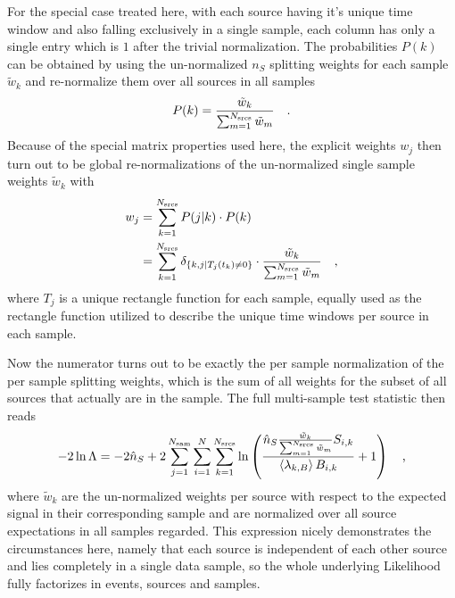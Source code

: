 For the special case treated here, with each source having it's unique time window and also falling exclusively in a single sample, each column has only a single entry which is $1$ after the trivial normalization. 
The probabilities $P(k)$ can be obtained by using the un-normalized $n_S$ splitting weights for each sample $\tilde{w}_k$ and re-normalize them over all sources in all samples
\begin{equation}
  P(k) = \frac{\tilde{w}_k}{\sum_{m=1}^{N_\text{srcs}} \tilde{w}_m}
  \quad\text{.}
\end{equation}
Because of the special matrix properties used here, the explicit weights $w_j$ then turn out to be global re-normalizations of the un-normalized single sample weights $\tilde{w}_k$ with
\begin{align}
  w_j
    &= \sum_{k=1}^{N_\text{srcs}} P(j|k)\cdot P(k) \\
    &= \sum_{k=1}^{N_\text{srcs}}
      \delta_{\{k,j|T_j(t_k)\neq 0\}} \cdot
      \frac{\tilde{w}_k}{\sum_{m=1}^{N_\text{srcs}} \tilde{w}_m}
  \quad\text{,}
\end{align}
where $T_j$ is a unique rectangle function for each sample, equally used as the rectangle function utilized to describe the unique time windows per source in each sample.

Now the numerator turns out to be exactly the per sample normalization of the per sample splitting weights, which is the sum of all weights for the subset of all sources that actually are in the sample.
The full multi-sample test statistic then reads
\begin{equation}
  -2\ln\Lambda
  = -2\hat{n}_S +
      2\sum_{j=1}^{N_\text{sam}} \sum_{i=1}^N \sum_{k=1}^{N_\text{srcs}}
      \ln\left(
        \frac{\hat{n}_{S}\frac{\tilde{w}_k}{\sum_{m=1}^{N_\text{srcs}}
              \tilde{w}_m} S_{i,k}}
             {\Braket{\lambda_{k,B}} B_{i,k}}
        + 1
      \right)
  \quad\text{,}
\end{equation}
where $\tilde{w}_k$ are the un-normalized weights per source with respect to the expected signal in their corresponding sample and are normalized over all source expectations in all samples regarded.
This expression nicely demonstrates the circumstances here, namely that each source is independent of each other source and lies completely in a single data sample, so the whole underlying Likelihood fully factorizes in events, sources and samples.

